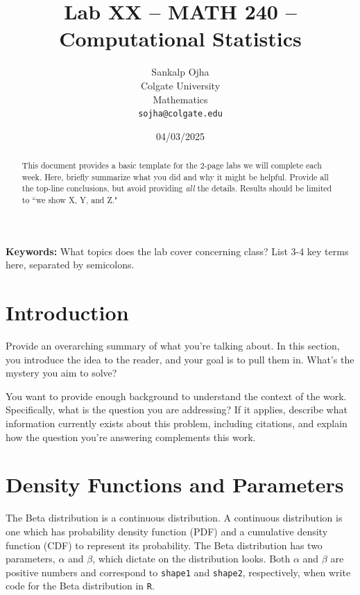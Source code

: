 \documentclass{article}\usepackage[]{graphicx}\usepackage[]{xcolor}
\begin{document}
\vspace{-1in}
\title{Lab XX -- MATH 240 -- Computational Statistics}

\author{
  Sankalp Ojha \\
  Colgate University  \\
  Mathematics  \\
  {\tt sojha@colgate.edu}
}

\date{04/03/2025}

\maketitle

\begin{multicols}{2}
\begin{abstract}
This document provides a basic template for the 2-page labs we will complete each week. Here, briefly summarize what you did and why it might be helpful. Provide all the top-line conclusions, but avoid providing \emph{all} the details. Results should be limited to ``we show X, Y, and Z."
\end{abstract}

\noindent \textbf{Keywords:} What topics does the lab cover concerning class? List 3-4 key terms here, separated by semicolons.

\section{Introduction}
Provide an overarching summary of what you're talking about. In this section, you introduce the idea to the reader, and your goal is to pull them in. What's the mystery you aim to solve?

You want to provide enough background to understand the context of the work. Specifically, what is the question you are addressing? If it applies, describe what information currently exists about this problem, including citations, and explain how the question you're answering complements this work.

\section{Density Functions and Parameters}
The Beta distribution is a continuous distribution. A continuous distribution is one which has probability density function (PDF) and a cumulative density function (CDF) to represent its probability. The Beta distribution has two parameters, $\alpha$ and $\beta$, which dictate on the distribution looks. Both $\alpha$ and $\beta$ are positive numbers and correspond to \texttt{shape1} and \texttt{shape2}, respectively, when write code for the Beta distribution in \texttt{R}.


\end{multicols}
\end{document}
